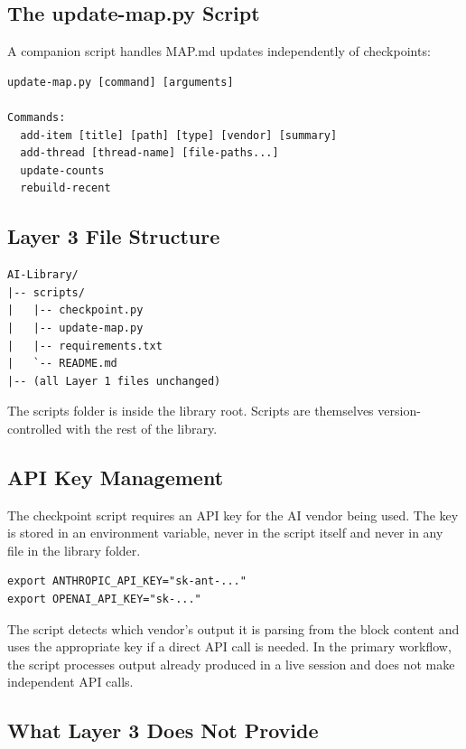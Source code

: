 \documentclass[12pt,letterpaper]{article}
\begin{document}
\subsection{The update-map.py Script}

A companion script handles MAP.md updates independently of checkpoints:

\begin{lstlisting}
update-map.py [command] [arguments]

Commands:
  add-item [title] [path] [type] [vendor] [summary]
  add-thread [thread-name] [file-paths...]
  update-counts
  rebuild-recent
\end{lstlisting}

\subsection{Layer 3 File Structure}

\begin{lstlisting}
AI-Library/
|-- scripts/
|   |-- checkpoint.py
|   |-- update-map.py
|   |-- requirements.txt
|   `-- README.md
|-- (all Layer 1 files unchanged)
\end{lstlisting}

The scripts folder is inside the library root. Scripts are themselves
version-controlled with the rest of the library.

\subsection{API Key Management}

The checkpoint script requires an API key for the AI vendor being used.
The key is stored in an environment variable, never in the script itself
and never in any file in the library folder.

\begin{lstlisting}
export ANTHROPIC_API_KEY="sk-ant-..."
export OPENAI_API_KEY="sk-..."
\end{lstlisting}

The script detects which vendor's output it is parsing from the block
content and uses the appropriate key if a direct API call is needed.
In the primary workflow, the script processes output already produced
in a live session and does not make independent API calls.

\subsection{What Layer 3 Does Not Provide}
\end{document}
